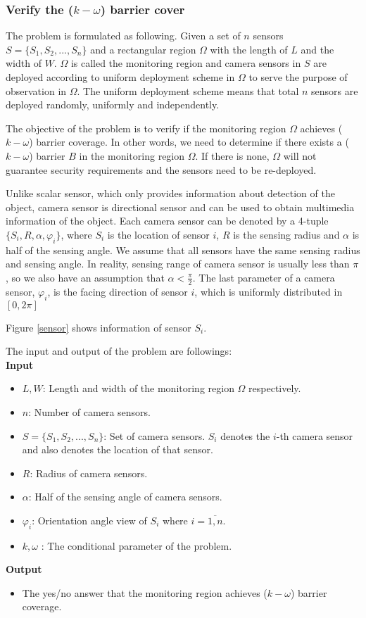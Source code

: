 \subsubsection{Verify the ($k-\omega$) barrier cover}
The problem is formulated as following. Given a set of $n$ sensors $S=\{S_1,S_2,...,S_n\}$ and a rectangular region $\Omega$ with the length of $L$ and the width of $W$. $\Omega$ is called the monitoring region and camera sensors in $S$ are deployed according to uniform deployment scheme in $\Omega$ to serve the purpose of observation in $\Omega$. The uniform deployment scheme means that total $ n $ sensors are deployed randomly, uniformly and independently.\par

The objective of the problem is to verify if the monitoring region $\Omega$ achieves ($k-\omega$) barrier coverage. In other words, we need to determine if there exists a ($k-\omega$) barrier $B$ in the monitoring region $\Omega$. If there is none, $\Omega$ will not guarantee security requirements and the sensors need to be re-deployed.\par

Unlike scalar sensor, which only provides information about detection of the object, camera sensor is directional sensor and can be used to obtain multimedia information of the object. Each camera sensor can be denoted by a 4-tuple $\{S_i, R, \alpha, \varphi_i\}$, where $S_i$ is the location of sensor $i$, $R$ is the sensing radius and $\alpha$ is half of the sensing angle. We assume that all sensors have the same sensing radius and sensing angle. In reality, sensing range of camera sensor is usually less than $\pi$, so we also have an assumption that $\alpha < \displaystyle\frac{\pi}{2}$. The last parameter of a camera sensor, $\varphi_i$, is the facing direction of sensor $i$, which is uniformly distributed in $[0,2\pi]$ \par
Figure \ref{sensor} shows information of sensor $S_i$.
%

\noindent The input and output of the problem are followings:\\[7pt]
{\bfseries Input}
\begin{itemize}
	\item $L, W$: Length and width of the monitoring region $\Omega$ respectively.
	\item $n$: Number of camera sensors.
	\item $S = \{S_1,S_2,...,S_n\}$: Set of camera sensors. $S_i$ denotes the $i$-th camera sensor and also denotes the location of that sensor.
	\item $R$: Radius of camera sensors.
	\item $\alpha$: Half of the sensing angle of camera sensors.
	\item $\varphi_i$: Orientation angle view of $S_i$ where $i=\overline{1,n}$.
	\item $k, \omega$ : The conditional parameter of the problem.
\end{itemize}
{\bfseries Output}
\begin{itemize}
	\item The yes/no answer that the monitoring region achieves ($k-\omega$) barrier coverage. 
\end{itemize}

